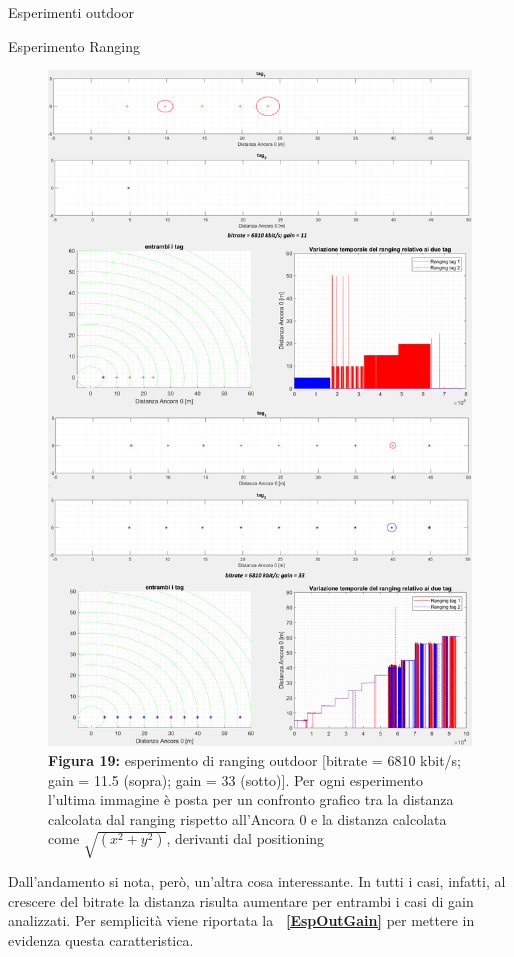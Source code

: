 \documentclass[12pt]{report}
\begin{document}
\begin{section}{Esperimenti outdoor}
\begin{subsection}{Esperimento Ranging}
			\begin{figure}[H]
				\centering
				\includegraphics[scale=0.17]{EspOut6810}
	 			\caption{\textbf{Figura 19:} esperimento di ranging outdoor [bitrate = 6810 kbit/s; gain = 11.5 (sopra); gain = 33 (sotto)]. Per ogni  esperimento l'ultima immagine è posta per un confronto grafico tra la distanza calcolata dal ranging rispetto all'Ancora 0 e la distanza calcolata come $\sqrt{(x^2+y^2)}$, 						derivanti dal positioning \label{EspOut6810}}
			\end{figure}	
			Dall'andamento si nota, però, un'altra cosa interessante. In tutti i casi, infatti, al crescere del bitrate la distanza risulta aumentare per entrambi i casi di gain analizzati. Per semplicità viene riportata la  \textbf{\tablename~\ref{EspOutGain}} per mettere in evidenza questa caratteristica.


\end{subsection}
\end{section}
\end{document}
